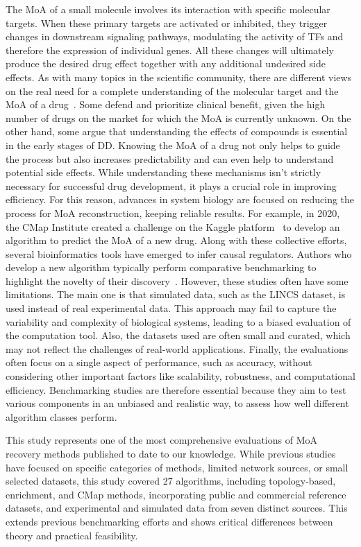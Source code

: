The \gls{MoA} of a small molecule involves its interaction with specific molecular targets. When these primary targets are activated or inhibited, they trigger changes in downstream signaling pathways, modulating the activity of \gls{TF}s and therefore the expression of individual genes. 
All these changes will ultimately produce the desired drug effect together with any additional undesired side effects. 
As with many topics in the scientific community, there are different views on the real need for a complete understanding of the molecular target and the \gls{MoA} of a drug~\cite{RN112}. 
Some defend and prioritize clinical benefit, given the high number of drugs on the market for which the \gls{MoA} is currently unknown. 
On the other hand, some argue that understanding the effects of compounds is essential in the early stages of \gls{DD}. 
Knowing the \gls{MoA} of a drug not only helps to guide the process but also increases predictability and can even help to understand potential side effects. 
While understanding these mechanisms isn't strictly necessary for successful drug development, it plays a crucial role in improving efficiency. 
For this reason, advances in system biology are focused on reducing the process for \gls{MoA} reconstruction, keeping reliable results. 
For example, in 2020, the \gls{CMap} Institute created a challenge on the Kaggle platform~\cite{RN162} to develop an algorithm to predict the \gls{MoA} of a new drug. 
Along with these collective efforts, several bioinformatics tools have emerged to infer causal regulators. 
Authors who develop a new algorithm typically perform comparative benchmarking to highlight the novelty of their discovery~\cite{RN109}. 
However, these studies often have some limitations. The main one is that simulated data, such as the \gls{LINCS} dataset, is used instead of real experimental data. 
This approach may fail to capture the variability and complexity of biological systems, leading to a biased evaluation of the computation tool.
Also, the datasets used are often small and curated, which may not reflect the challenges of real-world applications.
Finally, the evaluations often focus on a single aspect of performance, such as accuracy, without considering other important factors like scalability, robustness, and computational efficiency. 
Benchmarking studies are therefore essential because they aim to test various components in an unbiased and realistic way, to assess how well different algorithm classes perform.

This study represents one of the most comprehensive evaluations of \gls{MoA} recovery methods published to date to our knowledge. 
While previous studies have focused on specific categories of methods, limited network sources, or small selected datasets, this study covered 27 algorithms, including topology-based, enrichment, and \gls{CMap} methods, incorporating public and commercial reference datasets, and experimental and simulated data from seven distinct sources. 
This extends previous benchmarking efforts and shows critical differences between theory and practical feasibility.

